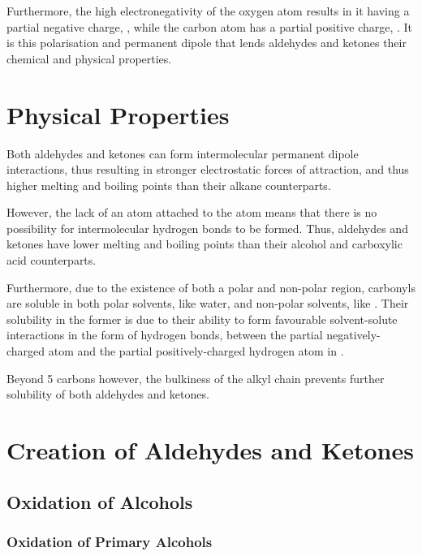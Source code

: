 			Furthermore, the high electronegativity of the oxygen atom results in it having a partial negative charge, \deltam{}, while the
			carbon atom has a partial positive charge, \deltap{}. It is this polarisation and permanent dipole that lends aldehydes and ketones
			their chemical and physical properties.



	\section{Physical Properties}

		Both aldehydes and ketones can form intermolecular permanent dipole interactions, thus resulting in stronger electrostatic forces
		of attraction, and thus higher melting and boiling points than their alkane counterparts.

		However, the lack of an  atom attached to the  atom means that there is no possibility for intermolecular hydrogen
		bonds to be formed. Thus, aldehydes and ketones have lower melting and boiling points than their alcohol and carboxylic acid
		counterparts.

		Furthermore, due to the existence of both a polar and non-polar region, carbonyls are soluble in both polar solvents, like water,
		and non-polar solvents, like . Their solubility in the former is due to their ability to form favourable
		solvent-solute interactions in the form of hydrogen bonds, between the partial negatively-charged  atom and the partial
		positively-charged hydrogen atom in .

		Beyond 5 carbons however, the bulkiness of the alkyl chain prevents further solubility of both aldehydes and ketones.


	\pagebreak
	\section{Creation of Aldehydes and Ketones}

		\subsection{Oxidation of Alcohols}

			\subsubsection{Oxidation of Primary Alcohols}

